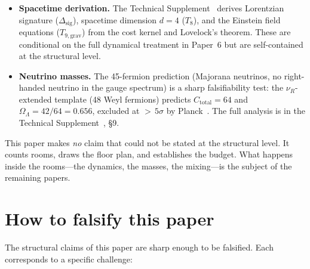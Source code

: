 \documentclass[11pt]{article}
\newenvironment{varlist}{\begin{itemize}[nosep,leftmargin=2em]}{\end{itemize}}
\begin{document}
\begin{varlist}
\item \textbf{Spacetime derivation.}  The Technical Supplement~\cite{BrookeP2Supplement} derives Lorentzian signature ($\Delta_{\mathrm{sig}}$), spacetime dimension $d = 4$ ($T_8$), and the Einstein field equations ($T_{9,\mathrm{grav}}$) from the cost kernel and Lovelock's theorem.  These are conditional on the full dynamical treatment in Paper~6 but are self-contained at the structural level.
\item \textbf{Neutrino masses.}  The 45-fermion prediction (Majorana neutrinos, no right-handed neutrino in the gauge spectrum) is a sharp falsifiability test: the $\nu_R$-extended template (48 Weyl fermions) predicts $C_{\mathrm{total}} = 64$ and $\Omega_\Lambda = 42/64 = 0.656$, excluded at ${>}\,5\sigma$ by Planck~\cite{Planck2020}.  The full analysis is in the Technical Supplement~\cite{BrookeP2Supplement}, \S9.
\end{varlist}

This paper makes \emph{no} claim that could not be stated at the structural level.  It counts rooms, draws the floor plan, and establishes the budget.  What happens inside the rooms---the dynamics, the masses, the mixing---is the subject of the remaining papers.


\section{How to falsify this paper}
\label{sec:falsify}

The structural claims of this paper are sharp enough to be falsified.  Each corresponds to a specific challenge:
\end{document}
